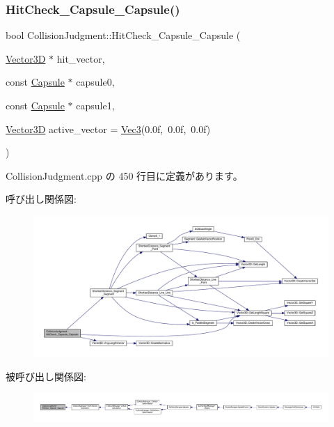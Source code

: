 \subsubsection{\texorpdfstring{Hit\+Check\+\_\+\+Capsule\+\_\+\+Capsule()}{HitCheck\_Capsule\_Capsule()}}
{\footnotesize\ttfamily bool Collision\+Judgment\+::\+Hit\+Check\+\_\+\+Capsule\+\_\+\+Capsule (\begin{DoxyParamCaption}\item[{\mbox{\hyperlink{class_vector3_d}{Vector3D}} $\ast$}]{hit\+\_\+vector,  }\item[{const \mbox{\hyperlink{class_capsule}{Capsule}} $\ast$}]{capsule0,  }\item[{const \mbox{\hyperlink{class_capsule}{Capsule}} $\ast$}]{capsule1,  }\item[{\mbox{\hyperlink{class_vector3_d}{Vector3D}}}]{active\+\_\+vector = {\ttfamily \mbox{\hyperlink{_vector3_d_8h_ab16f59e4393f29a01ec8b9bbbabbe65d}{Vec3}}(0.0f,~0.0f,~0.0f)} }\end{DoxyParamCaption})\hspace{0.3cm}{\ttfamily [static]}}



 Collision\+Judgment.\+cpp の 450 行目に定義があります。

呼び出し関係図\+:\nopagebreak
\begin{figure}[H]
\begin{center}
\leavevmode
\includegraphics[width=350pt]{class_collision_judgment_a95962556f370a964ec1961b1c461ae2a_cgraph}
\end{center}
\end{figure}
被呼び出し関係図\+:
\nopagebreak
\begin{figure}[H]
\begin{center}
\leavevmode
\includegraphics[width=350pt]{class_collision_judgment_a95962556f370a964ec1961b1c461ae2a_icgraph}
\end{center}
\end{figure}
\mbox{\label{class_collision_judgment_a3c0a99feef4531370096d458aefa8941}} 
